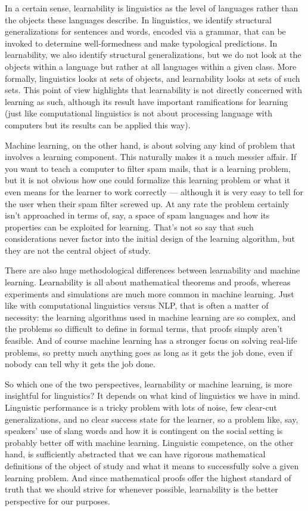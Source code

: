 In a certain sense, learnability is linguistics as the level of languages rather than the objects these languages describe.
In linguistics, we identify structural generalizations for sentences and words, encoded via a grammar, that can be invoked to determine well-formedness and make typological predictions.
In learnability, we also identify structural generalizations, but we do not look at the objects within a language but rather at all languages within a given class.
More formally, linguistics looks at sets of objects, and learnability looks at sets of such sets.
This point of view highlights that learnability is not directly concerned with learning as such, although its result have important ramifications for learning (just like computational linguistics is not about processing language with computers but its results can be applied this way).

Machine learning, on the other hand, is about solving any kind of problem that involves a learning component.
This naturally makes it a much messier affair.
If you want to teach a computer to filter spam mails, that is a learning problem, but it is not obvious how one could formalize this learning problem or what it even means for the learner to work correctly --- although it is very easy to tell for the user when their spam filter screwed up.
At any rate the problem certainly isn't approached in terms of, say, a space of spam languages and how its properties can be exploited for learning.
That's not so say that such considerations never factor into the initial design of the learning algorithm, but they are not the central object of study.

There are also huge methodological differences between learnability and machine learning.
Learnability is all about mathematical theorems and proofs, whereas experiments and simulations are much more common in machine learning.
Just like with computational linguistics versus NLP, that is often a matter of necessity: the learning algorithms used in machine learning are so complex, and the problems so difficult to define in formal terms, that proofs simply aren't feasible.
And of course machine learning has a stronger focus on solving real-life problems, so pretty much anything goes as long as it gets the job done, even if nobody can tell why it gets the job done.

So which one of the two perspectives, learnability or machine learning, is more insightful for linguistics?
It depends on what kind of linguistics we have in mind.
Linguistic performance is a tricky problem with lots of noise, few clear-cut generalizations, and no clear success state for the learner, so a problem like, say, speakers' use of slang words and how it is contingent on the social setting is probably better off with machine learning.
Linguistic competence, on the other hand, is sufficiently abstracted that we can have rigorous mathematical definitions of the object of study and what it means to successfully solve a given learning problem.
And since mathematical proofs offer the highest standard of truth that we should strive for whenever possible, learnability is the better perspective for our purposes.


